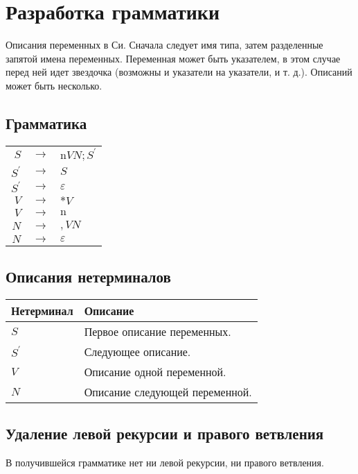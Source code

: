 \section{Разработка грамматики}

Описания переменных в Си. Сначала следует имя типа, затем разделенные запятой имена переменных. Переменная может быть указателем, в этом случае перед ней идет звездочка (возможны и указатели на указатели, и т. д.). Описаний может быть несколько.

\subsection{Грамматика}

\begin{center}
    \begin{tabular}{ r c l }
        $S$ & $\rightarrow$ & $\mathrm{n} VN\mathrm{;} S^{'}$ \\
        $S^{'}$ & $\rightarrow$ & $S$ \\
        $S^{'}$ & $\rightarrow$ & $\varepsilon$ \\
        $V$ & $\rightarrow$ & $\mathrm{*} V$ \\
        $V$ & $\rightarrow$ & $\mathrm{n}$ \\
        $N$ & $\rightarrow$ & $\mathrm{,} VN$ \\
        $N$ & $\rightarrow$ & $\varepsilon$ \\
    \end{tabular}
\end{center}

\subsection{Описания нетерминалов}

\begin{center}
    \begin{tabular}{ | l | l | }
        \hline
        \textbf{Нетерминал} & \textbf{Описание} \\
        \hline
        $S$ & Первое описание переменных. \\
        \hline
        $S^{'}$ & Следующее описание. \\
        \hline
        $V$ & Описание одной переменной. \\
        \hline
        $N$ & Описание следующей переменной. \\
        \hline
    \end{tabular}
\end{center}

\subsection{Удаление левой рекурсии и правого ветвления}
В получившейся грамматике нет ни левой рекурсии, ни правого ветвления.

